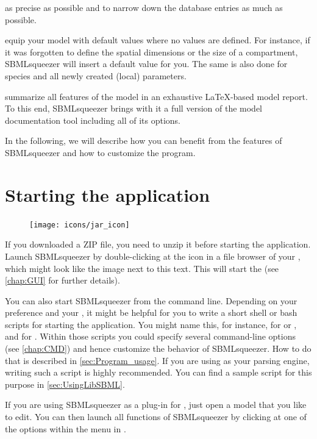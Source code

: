 \begin{dinglist}{52}
  as precise as possible and to narrow down the database entries as much as possible.
\item equip your model with default values where no values are defined. For instance,
  if it was forgotten to define the spatial dimensions or the size of a compartment,
  SBMLsqueezer will insert a default value for you. The same is also done for species
  and all newly created (local) parameters.
\item summarize all features of the model in an exhaustive \LaTeX-based model report.
  To this end, SBMLsqueezer brings with it a full version of the model documentation
  tool \SBMLLaTeX including all of its options.
\end{dinglist}
In the following, we will describe how you can benefit from the features of SBMLsqueezer
and how to customize the program.

\section{Starting the application}
\label{startingTheProgram}

\begin{figure}
\vspace{\wrapfigspace}
\texttt{[image: icons/jar\_icon]}
\end{figure}
If you downloaded a ZIP file, you need to unzip it before starting the application.
Launch SBMLsqueezer by double-clicking at the \Java icon in a file browser of
your \OS, which might look like the image next to this text.
This will start the \GUI (see \vref{chap:GUI} for further details).

You can also start SBMLsqueezer from the command line.
Depending on your preference and your \OS, it might be helpful for
you to write a short shell or bash scripts for starting the application.
You might name this, for instance,  for \Linux or \MacOSX, and
 for \Windows. Within those scripts you could specify several
command-line options (see \vref{chap:CMD}) and hence customize the behavior of SBMLsqueezer.
How to do that is described in \vref{sec:Program_usage}.
If you are using \libSBML as your \SBML parsing engine, writing such a script is highly recommended.
You can find a sample script for this purpose in \vref{sec:UsingLibSBML}.

If you are using SBMLsqueezer as a plug-in for \CellDesigner, just open a model that you like to edit.
You can then launch all functions of SBMLsqueezer by clicking at one of the options within the menu
 in \CellDesigner.

